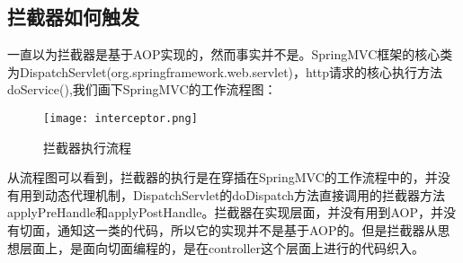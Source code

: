 \documentclass[../../../interview-questions.tex]{subfiles}
\begin{document}
\subsection{拦截器如何触发}

一直以为拦截器是基于AOP实现的，然而事实并不是。SpringMVC框架的核心类为DispatchServlet(org.springframework.web.servlet)，http请求的核心执行方法doService(),我们画下SpringMVC的工作流程图：

\begin{figure}[htbp]
	\centering
	\texttt{[image: interceptor.png]}
	\caption{拦截器执行流程}
	\label{fig:interceptor}
\end{figure}

从流程图可以看到，拦截器的执行是在穿插在SpringMVC的工作流程中的，并没有用到动态代理机制，DispatchServlet的doDispatch方法直接调用的拦截器方法applyPreHandle和applyPostHandle。拦截器在实现层面，并没有用到AOP，并没有切面，通知这一类的代码，所以它的实现并不是基于AOP的。但是拦截器从思想层面上，是面向切面编程的，是在controller这个层面上进行的代码织入。
\end{document}
